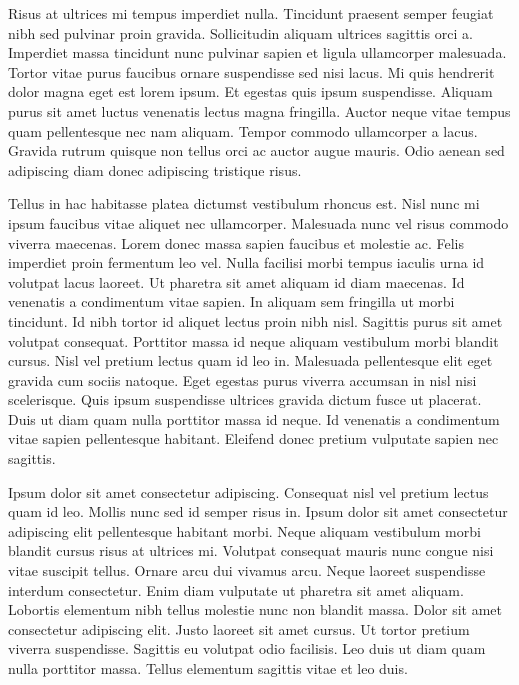 Risus at ultrices mi tempus imperdiet nulla. Tincidunt praesent semper feugiat nibh sed pulvinar proin gravida. Sollicitudin aliquam ultrices sagittis orci a. Imperdiet massa tincidunt nunc pulvinar sapien et ligula ullamcorper malesuada. Tortor vitae purus faucibus ornare suspendisse sed nisi lacus. Mi quis hendrerit dolor magna eget est lorem ipsum. Et egestas quis ipsum suspendisse. Aliquam purus sit amet luctus venenatis lectus magna fringilla. Auctor neque vitae tempus quam pellentesque nec nam aliquam. Tempor commodo ullamcorper a lacus. Gravida rutrum quisque non tellus orci ac auctor augue mauris. Odio aenean sed adipiscing diam donec adipiscing tristique risus.

Tellus in hac habitasse platea dictumst vestibulum rhoncus est. Nisl nunc mi ipsum faucibus vitae aliquet nec ullamcorper. Malesuada nunc vel risus commodo viverra maecenas. Lorem donec massa sapien faucibus et molestie ac. Felis imperdiet proin fermentum leo vel. Nulla facilisi morbi tempus iaculis urna id volutpat lacus laoreet. Ut pharetra sit amet aliquam id diam maecenas. Id venenatis a condimentum vitae sapien. In aliquam sem fringilla ut morbi tincidunt. Id nibh tortor id aliquet lectus proin nibh nisl. Sagittis purus sit amet volutpat consequat. Porttitor massa id neque aliquam vestibulum morbi blandit cursus. Nisl vel pretium lectus quam id leo in. Malesuada pellentesque elit eget gravida cum sociis natoque. Eget egestas purus viverra accumsan in nisl nisi scelerisque. Quis ipsum suspendisse ultrices gravida dictum fusce ut placerat. Duis ut diam quam nulla porttitor massa id neque. Id venenatis a condimentum vitae sapien pellentesque habitant. Eleifend donec pretium vulputate sapien nec sagittis.

Ipsum dolor sit amet consectetur adipiscing. Consequat nisl vel pretium lectus quam id leo. Mollis nunc sed id semper risus in. Ipsum dolor sit amet consectetur adipiscing elit pellentesque habitant morbi. Neque aliquam vestibulum morbi blandit cursus risus at ultrices mi. Volutpat consequat mauris nunc congue nisi vitae suscipit tellus. Ornare arcu dui vivamus arcu. Neque laoreet suspendisse interdum consectetur. Enim diam vulputate ut pharetra sit amet aliquam. Lobortis elementum nibh tellus molestie nunc non blandit massa. Dolor sit amet consectetur adipiscing elit. Justo laoreet sit amet cursus. Ut tortor pretium viverra suspendisse. Sagittis eu volutpat odio facilisis. Leo duis ut diam quam nulla porttitor massa. Tellus elementum sagittis vitae et leo duis.

